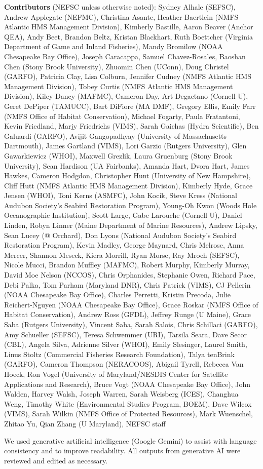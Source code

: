 \documentclass[
  10pt,
]{article}
\begin{document}
\textbf{Contributors} (NEFSC unless otherwise noted): Sydney Alhale (SEFSC), Andrew Applegate (NEFMC), Christina Asante, Heather Baertlein (NMFS Atlantic HMS Management Division), Kimberly Bastille, Aaron Beaver (Anchor QEA), Andy Beet, Brandon Beltz, Kristan Blackhart, Ruth Boettcher (Virginia Department of Game and Inland Fisheries), Mandy Bromilow (NOAA Chesapeake Bay Office), Joseph Caracappa, Samuel Chavez-Rosales, Baoshan Chen (Stony Brook University), Zhuomin Chen (UConn), Doug Christel (GARFO), Patricia Clay, Lisa Colburn, Jennifer Cudney (NMFS Atlantic HMS Management Division), Tobey Curtis (NMFS Atlantic HMS Management Division), Kiley Dancy (MAFMC), Cameron Day, Art Degaetano (Cornell U), Geret DePiper (TAMUCC), Bart DiFiore (MA DMF), Gregory Ellis, Emily Farr (NMFS Office of Habitat Conservation), Michael Fogarty, Paula Fratantoni, Kevin Friedland, Marjy Friedrichs (VIMS), Sarah Gaichas (Hydra Scientific), Ben Galuardi (GARFO), Avijit Gangopadhyay (University of Massachusetts Dartmouth), James Gartland (VIMS), Lori Garzio (Rutgers University), Glen Gawarkiewicz (WHOI), Maxwell Grezlik, Laura Gruenburg (Stony Brook University), Sean Hardison (UA Fairbanks), Amanda Hart, Dvora Hart, James Hawkes, Cameron Hodgdon, Christopher Hunt (University of New Hampshire), Cliff Hutt (NMFS Atlantic HMS Management Division), Kimberly Hyde, Grace Jensen (WHOI), Toni Kerns (ASMFC), John Kocik, Steve Kress (National Audubon Society's Seabird Restoration Program), Young-Oh Kwon (Woods Hole Oceanographic Institution), Scott Large, Gabe Larouche (Cornell U), Daniel Linden, Robyn Linner (Maine Department of Marine Resources), Andrew Lipsky, Sean Lucey (@ Orchard), Don Lyons (National Audubon Society's Seabird Restoration Program), Kevin Madley, George Maynard, Chris Melrose, Anna Mercer, Shannon Meseck, Kiera Morrill, Ryan Morse, Ray Mroch (SEFSC), Nicole Mucci, Brandon Muffley (MAFMC), Robert Murphy, Kimberly Murray, David Moe Nelson (NCCOS), Chris Orphanides, Stephanie Owen, Richard Pace, Debi Palka, Tom Parham (Maryland DNR), Chris Patrick (VIMS), CJ Pellerin (NOAA Chesapeake Bay Office), Charles Perretti, Kristin Precoda, Julie Reichert-Nguyen (NOAA Chesapeake Bay Office), Grace Roskar (NMFS Office of Habitat Conservation), Andrew Ross (GFDL), Jeffrey Runge (U Maine), Grace Saba (Rutgers University), Vincent Saba, Sarah Salois, Chris Schillaci (GARFO), Amy Schueller (SEFSC), Teresa Schwemmer (URI), Tarsila Seara, Dave Secor (CBL), Angela Silva, Adrienne Silver (WHOI), Emily Slesinger, Laurel Smith, Linus Stoltz (Commercial Fisheries Research Foundation), Talya tenBrink (GARFO), Cameron Thompson (NERACOOS), Abigail Tyrell, Rebecca Van Hoeck, Ron Vogel (University of Maryland/NESDIS Center for Satellite Applications and Research), Bruce Vogt (NOAA Chesapeake Bay Office), John Walden, Harvey Walsh, Joseph Warren, Sarah Weisberg (ICES), Changhua Weng, Timothy White (Environmental Studies Program, BOEM), Dave Wilcox (VIMS), Sarah Wilkin (NMFS Office of Protected Resources), Mark Wuenschel, Zhitao Yu, Qian Zhang (U Maryland), NEFSC staff

We used generative artificial intelligence (Google Gemini) to assist with language consistency and to improve readability. All outputs from generative AI were reviewed and edited as necessary.
\end{document}
